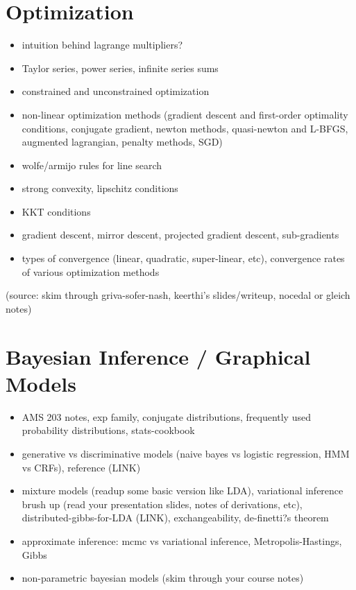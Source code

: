 \documentclass[english, 11pt]{article}
\begin{document}
\section{Optimization}
\begin{itemize}
\item intuition behind lagrange multipliers?
\item Taylor series, power series, infinite series sums
\item constrained and unconstrained optimization
\item non-linear optimization methods (gradient descent and first-order optimality conditions, conjugate gradient, newton methods, quasi-newton and L-BFGS, augmented lagrangian, penalty methods, SGD)
\item wolfe/armijo rules for line search
\item strong convexity, lipschitz conditions
\item KKT conditions
\item gradient descent, mirror descent, projected gradient descent, sub-gradients
\item types of convergence (linear, quadratic, super-linear, etc), convergence rates of various optimization methods
\end{itemize}
(source: skim through griva-sofer-nash, keerthi's slides/writeup, nocedal or gleich notes)


\section{Bayesian Inference / Graphical Models}
\begin{itemize}
\item AMS 203 notes, exp family, conjugate distributions, frequently used probability distributions, stats-cookbook
\item generative vs discriminative models (naive bayes vs logistic regression, HMM vs CRFs), reference (LINK)
\item mixture models (readup some basic version like LDA), variational inference brush up (read your presentation slides, notes of derivations, etc), distributed-gibbs-for-LDA (LINK), exchangeability, de-finetti?s theorem
\item approximate inference: mcmc vs variational inference, Metropolis-Hastings, Gibbs
\item non-parametric bayesian models (skim through your course notes)
\end{itemize}
\end{document}
